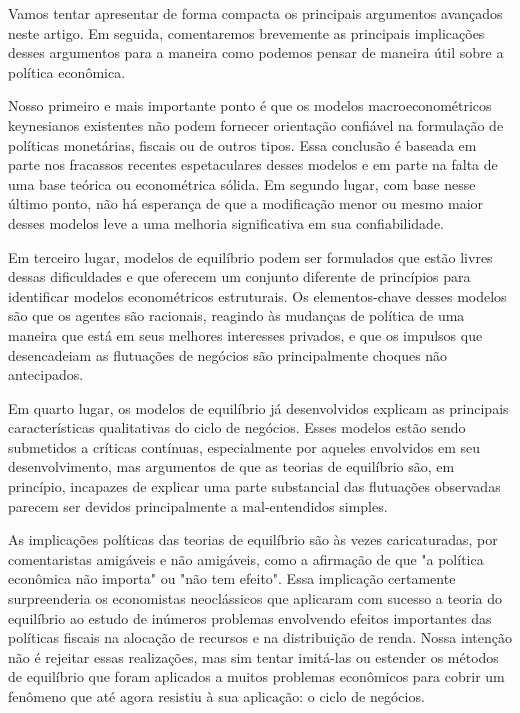 \documentclass[a4paper,12pt]{article}[abntex2]
\begin{document}
Vamos tentar apresentar de forma compacta os principais argumentos avançados neste artigo. Em seguida, comentaremos brevemente as principais implicações desses argumentos para a maneira como podemos pensar de maneira útil sobre a política econômica.

Nosso primeiro e mais importante ponto é que os modelos macroeconométricos keynesianos existentes não podem fornecer orientação confiável na formulação de políticas monetárias, fiscais ou de outros tipos. Essa conclusão é baseada em parte nos fracassos recentes espetaculares desses modelos e em parte na falta de uma base teórica ou econométrica sólida. Em segundo lugar, com base nesse último ponto, não há esperança de que a modificação menor ou mesmo maior desses modelos leve a uma melhoria significativa em sua confiabilidade.

Em terceiro lugar, modelos de equilíbrio podem ser formulados que estão livres dessas dificuldades e que oferecem um conjunto diferente de princípios para identificar modelos econométricos estruturais. Os elementos-chave desses modelos são que os agentes são racionais, reagindo às mudanças de política de uma maneira que está em seus melhores interesses privados, e que os impulsos que desencadeiam as flutuações de negócios são principalmente choques não antecipados.

Em quarto lugar, os modelos de equilíbrio já desenvolvidos explicam as principais características qualitativas do ciclo de negócios. Esses modelos estão sendo submetidos a críticas contínuas, especialmente por aqueles envolvidos em seu desenvolvimento, mas argumentos de que as teorias de equilíbrio são, em princípio, incapazes de explicar uma parte substancial das flutuações observadas parecem ser devidos principalmente a mal-entendidos simples.

As implicações políticas das teorias de equilíbrio são às vezes caricaturadas, por comentaristas amigáveis e não amigáveis, como a afirmação de que "a política econômica não importa" ou "não tem efeito". Essa implicação certamente surpreenderia os economistas neoclássicos que aplicaram com sucesso a teoria do equilíbrio ao estudo de inúmeros problemas envolvendo efeitos importantes das políticas fiscais na alocação de recursos e na distribuição de renda. Nossa intenção não é rejeitar essas realizações, mas sim tentar imitá-las ou estender os métodos de equilíbrio que foram aplicados a muitos problemas econômicos para cobrir um fenômeno que até agora resistiu à sua aplicação: o ciclo de negócios.
\end{document}

